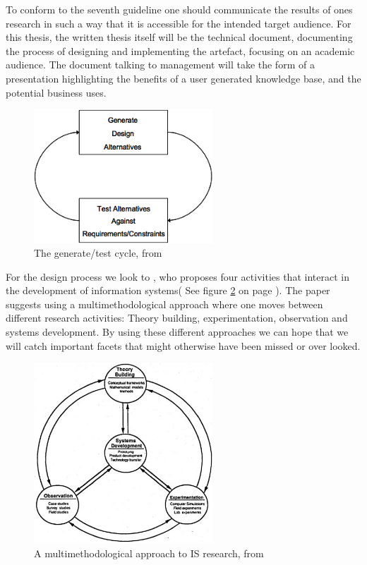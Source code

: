 To conform to the seventh guideline one should communicate the results of ones research in such a way that it is accessible for the intended target audience.
For this thesis, the written thesis itself will be the technical document, documenting the process of designing and implementing the artefact, focusing on an academic audience.
The document talking to management will take the form of a presentation highlighting the benefits of a user generated knowledge base, and the potential business uses.

\begin{figure}[h]
    \begin{center}
        \includegraphics[width=0.60\textwidth]{Images/GenerateTestCycle.png}
        \caption{The generate/test cycle, from \protect \citet{Hevner2004}}
        \label{GenerateTestCycle}
    \end{center}
\end{figure}

For the design process we look to \citet{Chen1990}, who proposes four activities that interact in the development of information systems( See figure \ref{multi} on page \pageref{multi}). 
The paper suggests using a multimethodological approach where one moves between different research activities: Theory building, experimentation, observation and systems development.
By using these different approaches we can hope that we will catch important facets that might otherwise have been missed or over looked.   

\begin{figure}[h]
    \begin{center}
        \includegraphics[width=0.60\textwidth]{Images/MultiMethodological.png}
        \caption{A multimethodological approach to IS research, from \protect \citet{Chen1990}}
        \label{multi}
    \end{center}
\end{figure}

